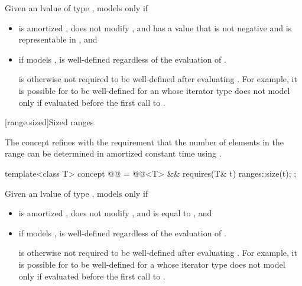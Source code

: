 \begin{itemdescr}
\pnum
Given an lvalue  of type ,
 models  only if
\begin{itemize}
\item
{} is amortized ,
does not modify , and
has a value that
is not negative and is representable in , and
\item
if  models ,
 is well-defined
regardless of the evaluation of .
\begin{note}
 is otherwise not required to be well-defined
after evaluating .
For example,
it is possible for  to be well-defined for
an  whose
iterator type does not model 
only if evaluated before the first call to .
\end{note}
\end{itemize}
\end{itemdescr}

[range.sized]{Sized ranges}

\pnum
The  concept
refines  with
the requirement that the number of elements in the range can be determined
in amortized constant time using .

\begin{itemdecl}
template<class T>
  concept @@ =
    @@<T> && requires(T& t) { ranges::size(t); };
\end{itemdecl}

\begin{itemdescr}
\pnum
Given an lvalue  of type , 
models  only if
\begin{itemize}
\item {} is amortized , does not modify ,
and is equal to , and

\item if  models ,
 is well-defined regardless of the evaluation of
.
\begin{note}
 is otherwise not required to be
well-defined after evaluating .
For example, it is possible for  to be well-defined
for a  whose iterator type
does not model 
only if evaluated before the first call to .
\end{note}
\end{itemize}
\end{itemdescr}

